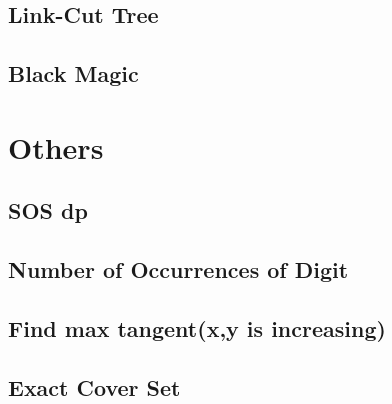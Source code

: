 \documentclass[a4paper,10pt,twocolumn,oneside]{article}
\begin{document}
\subsection{Link-Cut Tree}


% 

%

%

\subsection{Black Magic}


\section{Others}

\subsection{SOS dp}


\subsection{Number of Occurrences of Digit}


\subsection{Find max tangent(x,y is increasing)}


\subsection{Exact Cover Set}

\end{document}
